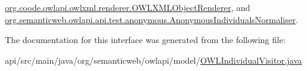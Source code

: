 \hyperlink{classorg_1_1coode_1_1owlapi_1_1owlxml_1_1renderer_1_1_o_w_l_x_m_l_object_renderer_af979817145e5fe55b50fda2ae7ed3f1b}{org.\-coode.\-owlapi.\-owlxml.\-renderer.\-O\-W\-L\-X\-M\-L\-Object\-Renderer}, and \hyperlink{classorg_1_1semanticweb_1_1owlapi_1_1api_1_1test_1_1anonymous_1_1_anonymous_individuals_normaliser_a22cfb656f8277bce0c20a07fde57cdc9}{org.\-semanticweb.\-owlapi.\-api.\-test.\-anonymous.\-Anonymous\-Individuals\-Normaliser}.



The documentation for this interface was generated from the following file\-:\begin{DoxyCompactItemize}
\item 
api/src/main/java/org/semanticweb/owlapi/model/\hyperlink{_o_w_l_individual_visitor_8java}{O\-W\-L\-Individual\-Visitor.\-java}\end{DoxyCompactItemize}
